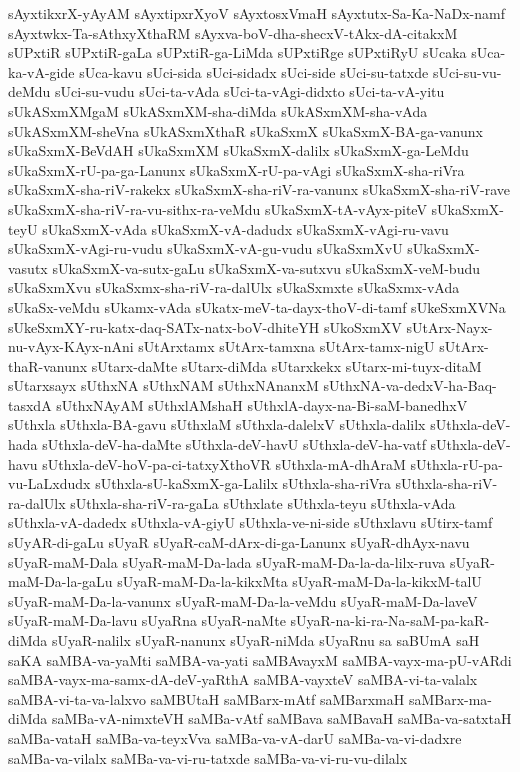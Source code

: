 {sAyxtikxrX-yAyAM
sAyxtipxrXyoV
sAyxtosxVmaH
sAyxtutx-Sa-Ka-NaDx-namf
sAyxtwkx-Ta-sAthxyXthaRM
sAyxva-boV-dha-shecxV-tAkx-dA-citakxM
sUPxtiR
sUPxtiR-gaLa
sUPxtiR-ga-LiMda
sUPxtiRge
sUPxtiRyU
sUcaka
sUca-ka-vA-gide
sUca-kavu
sUci-sida
sUci-sidadx
sUci-side
sUci-su-tatxde
sUci-su-vu-deMdu
sUci-su-vudu
sUci-ta-vAda
sUci-ta-vAgi-didxto
sUci-ta-vA-yitu
sUkASxmXMgaM
sUkASxmXM-sha-diMda
sUkASxmXM-sha-vAda
sUkASxmXM-sheVna
sUkASxmXthaR
sUkaSxmX
sUkaSxmX-BA-ga-vanunx
sUkaSxmX-BeVdAH
sUkaSxmXM
sUkaSxmX-dalilx
sUkaSxmX-ga-LeMdu
sUkaSxmX-rU-pa-ga-Lanunx
sUkaSxmX-rU-pa-vAgi
sUkaSxmX-sha-riVra
sUkaSxmX-sha-riV-rakekx
sUkaSxmX-sha-riV-ra-vanunx
sUkaSxmX-sha-riV-rave
sUkaSxmX-sha-riV-ra-vu-sithx-ra-veMdu
sUkaSxmX-tA-vAyx-piteV
sUkaSxmX-teyU
sUkaSxmX-vAda
sUkaSxmX-vA-dadudx
sUkaSxmX-vAgi-ru-vavu
sUkaSxmX-vAgi-ru-vudu
sUkaSxmX-vA-gu-vudu
sUkaSxmXvU
sUkaSxmX-vasutx
sUkaSxmX-va-sutx-gaLu
sUkaSxmX-va-sutxvu
sUkaSxmX-veM-budu
sUkaSxmXvu
sUkaSxmx-sha-riV-ra-dalUlx
sUkaSxmxte
sUkaSxmx-vAda
sUkaSx-veMdu
sUkamx-vAda
sUkatx-meV-ta-dayx-thoV-di-tamf
sUkeSxmXVNa
sUkeSxmXY-ru-katx-daq-SATx-natx-boV-dhiteYH
sUkoSxmXV
sUtArx-Nayx-nu-vAyx-KAyx-nAni
sUtArxtamx
sUtArx-tamxna
sUtArx-tamx-nigU
sUtArx-thaR-vanunx
sUtarx-daMte
sUtarx-diMda
sUtarxkekx
sUtarx-mi-tuyx-ditaM
sUtarxsayx
sUthxNA
sUthxNAM
sUthxNAnanxM
sUthxNA-va-dedxV-ha-Baq-tasxdA
sUthxNAyAM
sUthxlAMshaH
sUthxlA-dayx-na-Bi-saM-banedhxV
sUthxla
sUthxla-BA-gavu
sUthxlaM
sUthxla-dalelxV
sUthxla-dalilx
sUthxla-deV-hada
sUthxla-deV-ha-daMte
sUthxla-deV-havU
sUthxla-deV-ha-vatf
sUthxla-deV-havu
sUthxla-deV-hoV-pa-ci-tatxyXthoVR
sUthxla-mA-dhAraM
sUthxla-rU-pa-vu-LaLxdudx
sUthxla-sU-kaSxmX-ga-Lalilx
sUthxla-sha-riVra
sUthxla-sha-riV-ra-dalUlx
sUthxla-sha-riV-ra-gaLa
sUthxlate
sUthxla-teyu
sUthxla-vAda
sUthxla-vA-dadedx
sUthxla-vA-giyU
sUthxla-ve-ni-side
sUthxlavu
sUtirx-tamf
sUyAR-di-gaLu
sUyaR
sUyaR-caM-dArx-di-ga-Lanunx
sUyaR-dhAyx-navu
sUyaR-maM-Dala
sUyaR-maM-Da-lada
sUyaR-maM-Da-la-da-lilx-ruva
sUyaR-maM-Da-la-gaLu
sUyaR-maM-Da-la-kikxMta
sUyaR-maM-Da-la-kikxM-talU
sUyaR-maM-Da-la-vanunx
sUyaR-maM-Da-la-veMdu
sUyaR-maM-Da-laveV
sUyaR-maM-Da-lavu
sUyaRna
sUyaR-naMte
sUyaR-na-ki-ra-Na-saM-pa-kaR-diMda
sUyaR-nalilx
sUyaR-nanunx
sUyaR-niMda
sUyaRnu
sa
saBUmA
saH
saKA
saMBA-va-yaMti
saMBA-va-yati
saMBAvayxM
saMBA-vayx-ma-pU-vARdi
saMBA-vayx-ma-samx-dA-deV-yaRthA
saMBA-vayxteV
saMBA-vi-ta-valalx
saMBA-vi-ta-va-lalxvo
saMBUtaH
saMBarx-mAtf
saMBarxmaH
saMBarx-ma-diMda
saMBa-vA-nimxteVH
saMBa-vAtf
saMBava
saMBavaH
saMBa-va-satxtaH
saMBa-vataH
saMBa-va-teyxVva
saMBa-va-vA-darU
saMBa-va-vi-dadxre
saMBa-va-vilalx
saMBa-va-vi-ru-tatxde
saMBa-va-vi-ru-vu-dilalx
}
